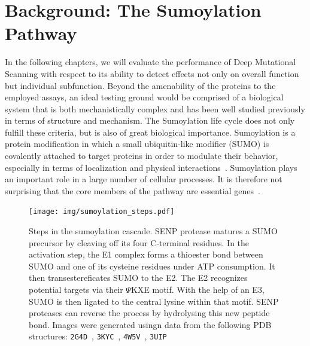 
\section{Background: The Sumoylation Pathway}
\label{intro:sumoylation}

In the following chapters, we will evaluate the performance of Deep Mutational Scanning with respect to its ability to detect effects not only on overall function but individual subfunction. Beyond the amenability of the proteins to the employed assays, an ideal testing ground would be comprised of a biological system that is both mechanistically complex and has been well studied previously in terms of structure and mechanism. The Sumoylation life cycle does not only fulfill these criteria, but is also of great biological importance. Sumoylation is a protein modification in which a small ubiquitin-like modifier (SUMO) is covalently attached to target proteins in order to modulate their behavior, especially in terms of localization and physical interactions~. Sumoylation plays an important role in a large number of cellular processes. It is therefore not surprising that the core members of the pathway are essential genes~.

\begin{figure}
	\centering
	\texttt{[image: img/sumoylation\_steps.pdf]}
	\caption{Steps in the sumoylation cascade. SENP protease matures a SUMO precursor by cleaving off its four C-terminal residues. In the activation step, the E1 complex forms a thioester bond  between SUMO and one of its cysteine residues under ATP consumption. It then transestereficates SUMO to the E2. The E2 recognizes potential targets via their $\Psi$KXE motif. With the help of an E3, SUMO is then ligated to the central lysine within that motif. SENP proteases can reverse the process by hydrolysing this new peptide bond. Images were generated usingn data from the following PDB structures: \texttt{2G4D}~\cite{xu_crystal_2006}, \texttt{3KYC}~\cite{olsen_active_2010}, \texttt{4W5V}~\cite{reiter_characterization_2016}, \texttt{3UIP}~\cite{gareau_determinants_2012}}
	\label{fig:sumoylation_steps}
\end{figure}

